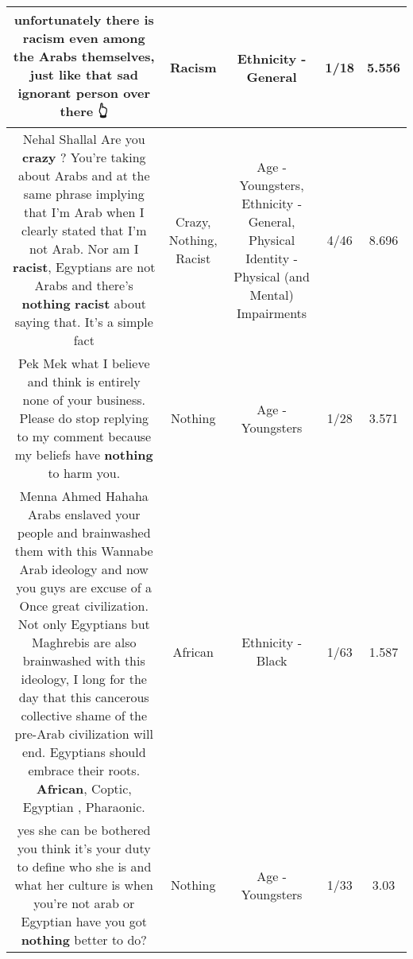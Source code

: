 \documentclass[11pt]{article}
\newlength\mylength
\begin{document}
\begin{center}
\begin{longtable}{|C{.65\mylength}|C{.30\mylength}|C{.12\mylength}|C{.12\mylength}|C{.12\mylength}|}
  \small unfortunately there is \textbf{racism} even among the Arabs themselves, just like that sad ignorant person over there 👆\normalsize   & Racism & Ethnicity - General & 1/18 & 5.556 \\  \hline
  \small Nehal Shallal Are you \textbf{crazy} ? You're taking about Arabs and at the same phrase implying that I'm Arab when I clearly stated that I'm not Arab. Nor am I \textbf{racist}, Egyptians are not Arabs and there's \textbf{nothing} \textbf{racist}  about saying that.  It's a simple fact\normalsize   & Crazy, Nothing, Racist & Age - Youngsters, Ethnicity - General, Physical Identity - Physical (and Mental) Impairments & 4/46 & 8.696 \\  \hline
  \small Pek Mek what I believe and think is entirely none of your business. Please do stop replying to my comment because my beliefs have \textbf{nothing} to harm you.\normalsize   & Nothing & Age - Youngsters & 1/28 & 3.571 \\  \hline
  \small Menna Ahmed Hahaha Arabs enslaved your people and brainwashed them with this Wannabe Arab ideology and now you guys are excuse of a Once great civilization.   Not  only Egyptians but  Maghrebis are also brainwashed with  this ideology,  I long for the day that this cancerous collective shame of the pre-Arab civilization will end. Egyptians should embrace their roots. \textbf{African}, Coptic, Egyptian , Pharaonic.\normalsize   & African & Ethnicity - Black & 1/63 & 1.587 \\  \hline
  \small yes she can be bothered you think it's your duty to define who she is and what her culture is when you're not arab or Egyptian have you got \textbf{nothing} better to do?\normalsize   & Nothing & Age - Youngsters & 1/33 & 3.03 \\  \hline

\end{longtable}
\end{center}
\end{document}
